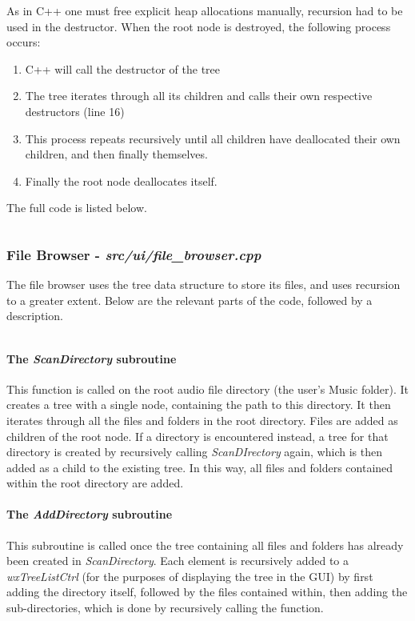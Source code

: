 As in C++ one must free explicit heap allocations manually,  recursion had to be used in the destructor. When the root node is destroyed, the following process occurs:
\begin{enumerate}
	\item C++ will call the destructor of the tree
	\item The tree iterates through all its children and calls their own respective destructors (line 16)
	\item This process repeats recursively until all children have deallocated their own children, and then finally themselves.
	\item Finally the root node deallocates itself.
\end{enumerate}
The full code is listed below.
\pagebreak
\inputminted[linenos]{c++}{../include/data/tree.h}

\pagebreak
\subsubsection{File Browser - \textit{src/ui/file\_browser.cpp}}
The file browser uses the tree data structure to store its files, and uses recursion to a greater extent. Below are the relevant parts of the code, followed by a description.

\inputminted[linenos, firstline=47, lastline=108]{c++}{../src/ui/file_browser.cpp}

\paragraph{The \textit{ScanDirectory} subroutine} This function is called on the root audio file directory (the user's Music folder). It creates a tree with a single node, containing the path to this directory. It then iterates through all the files and folders in the root directory. Files are added as children of the root node. If a directory is encountered instead, a tree for that directory is created by recursively calling \textit{ScanDIrectory} again, which is then added as a child to the existing tree. In this way, all files and folders contained within the root directory are added.  

\paragraph{The \textit{AddDirectory} subroutine} This subroutine is called once the tree containing all files and folders has already been created in \textit{ScanDirectory}. Each element is recursively added to a \textit{wxTreeListCtrl} (for the purposes of displaying the tree in the GUI) by first adding the directory itself, followed by the files contained within, then adding the sub-directories, which is done by recursively calling the function.

